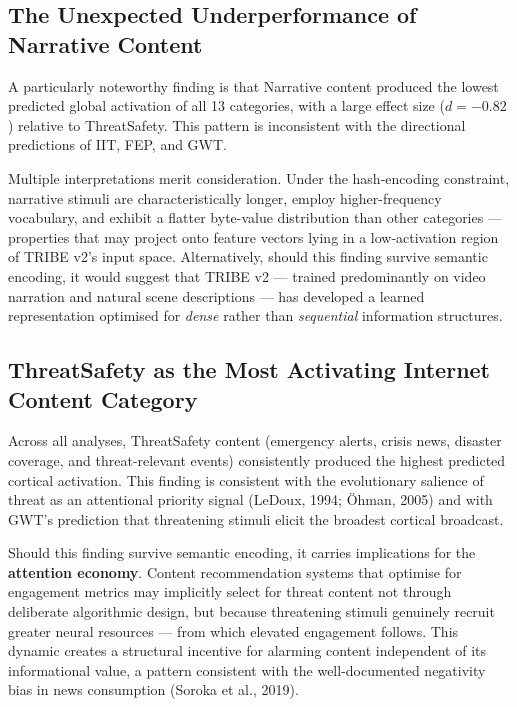 \documentclass[11pt,letterpaper]{article}
\numberwithin{equation}{section}
\begin{document}
\subsection{The Unexpected Underperformance of Narrative Content}

A particularly noteworthy finding is that Narrative content produced the lowest predicted global activation of all 13 categories, with a large effect size ($d = -0.82$) relative to ThreatSafety. This pattern is inconsistent with the directional predictions of IIT, FEP, and GWT.

Multiple interpretations merit consideration. Under the hash-encoding constraint, narrative stimuli are characteristically longer, employ higher-frequency vocabulary, and exhibit a flatter byte-value distribution than other categories --- properties that may project onto feature vectors lying in a low-activation region of TRIBE v2's input space. Alternatively, should this finding survive semantic encoding, it would suggest that TRIBE v2 --- trained predominantly on video narration and natural scene descriptions --- has developed a learned representation optimised for \textit{dense} rather than \textit{sequential} information structures.

\subsection{ThreatSafety as the Most Activating Internet Content Category}

Across all analyses, ThreatSafety content (emergency alerts, crisis news, disaster coverage, and threat-relevant events) consistently produced the highest predicted cortical activation. This finding is consistent with the evolutionary salience of threat as an attentional priority signal (LeDoux, 1994; \"{O}hman, 2005) and with GWT's prediction that threatening stimuli elicit the broadest cortical broadcast.

Should this finding survive semantic encoding, it carries implications for the \textbf{attention economy}. Content recommendation systems that optimise for engagement metrics may implicitly select for threat content not through deliberate algorithmic design, but because threatening stimuli genuinely recruit greater neural resources --- from which elevated engagement follows. This dynamic creates a structural incentive for alarming content independent of its informational value, a pattern consistent with the well-documented negativity bias in news consumption (Soroka et al., 2019).
\end{document}
